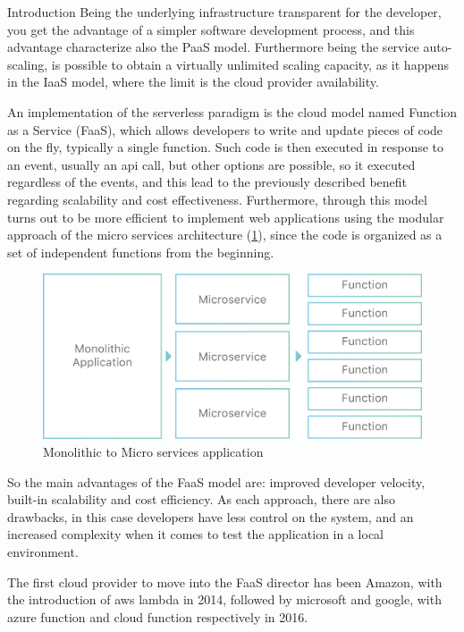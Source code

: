 \begin{chapter}{Introduction}
    Being the underlying infrastructure transparent for the developer, you get the advantage
    of a simpler software development process, and this advantage characterize also
    the PaaS model. Furthermore being the service auto-scaling, is possible to obtain
    a virtually unlimited scaling capacity, as it happens in the IaaS model, where the
    limit is the cloud provider availability.

    An implementation of the serverless paradigm is the cloud model named Function
    as a Service (FaaS), which allows developers to write and update pieces of code
    on the fly, typically a single function.
    Such code is then executed in response to an event, usually an api call, but other
    options are possible, so it executed regardless of the events, and this lead to
    the previously described benefit regarding scalability and cost effectiveness.
    Furthermore, through this model turns out to be more efficient to implement web
    applications using the modular approach of the micro services architecture
    (\ref{fig:monolithic_to_microservices}), since the code is organized as a set of
    independent functions from the beginning.

    \begin{figure}
        \centering
        \includegraphics[width=\linewidth]{source/images/monolithic-application-microservice-faas.png}
        \caption{Monolithic to Micro services application}
        \label{fig:monolithic_to_microservices}
    \end{figure}

    So the main advantages of the FaaS model are: improved developer velocity,
    built-in scalability and cost efficiency. As each approach, there are also drawbacks, in
    this case developers have less control on the system, and an increased complexity when it
    comes to test the application in a local environment.

    The first cloud provider to move into the FaaS director has been Amazon, with the
    introduction of aws lambda in 2014, followed by microsoft and google, with
    azure function and cloud function respectively in 2016.


\end{chapter}
